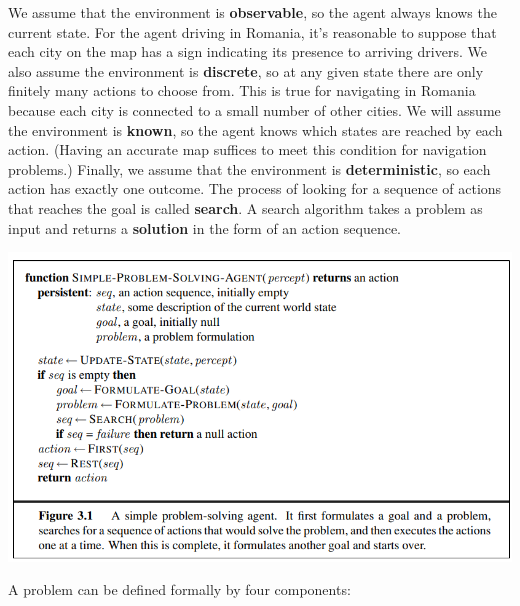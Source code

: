 We assume that the environment is \textbf{observable}, so the agent always knows the current state. For the agent driving in Romania, it’s reasonable to suppose that each city on the map has a sign indicating its presence to arriving drivers. We also assume the environment is \textbf{discrete}, so at any given state there are only finitely many actions to choose from. This is true for navigating in Romania because each city is connected to a small number of other cities. We will assume the environment is \textbf{known}, so the agent knows which states are reached by each action. (Having an accurate map suffices to meet this condition for navigation problems.) Finally, we assume that the environment is \textbf{deterministic}, so each action has exactly one outcome.\newline\newline
The process of looking for a sequence of actions that reaches the goal is called \textbf{search}. A search algorithm takes a problem as input and returns a \textbf{solution} in the form of an action sequence.
\begin{center}
    \includegraphics[scale=0.8]{images/problem-solving agent.png}
\end{center}
A problem can be defined formally by four components:
